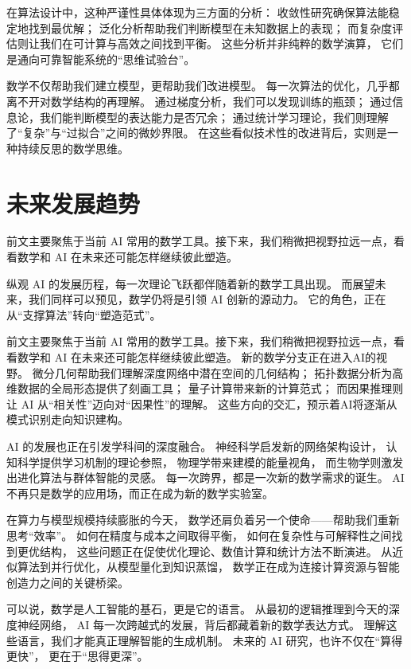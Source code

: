 在算法设计中，这种严谨性具体体现为三方面的分析：  
收敛性研究确保算法能稳定地找到最优解；  
泛化分析帮助我们判断模型在未知数据上的表现；  
而复杂度评估则让我们在可计算与高效之间找到平衡。  
这些分析并非纯粹的数学演算，  
它们是通向可靠智能系统的“思维试验台”。

数学不仅帮助我们建立模型，更帮助我们改进模型。  
每一次算法的优化，几乎都离不开对数学结构的再理解。  
通过梯度分析，我们可以发现训练的瓶颈；  
通过信息论，我们能判断模型的表达能力是否冗余；  
通过统计学习理论，我们则理解了“复杂”与“过拟合”之间的微妙界限。  
在这些看似技术性的改进背后，实则是一种持续反思的数学思维。

\section{未来发展趋势}
前文主要聚焦于当前 AI 常用的数学工具。接下来，我们稍微把视野拉远一点，看看数学和 AI 在未来还可能怎样继续彼此塑造。

纵观 AI 的发展历程，每一次理论飞跃都伴随着新的数学工具出现。  
而展望未来，我们同样可以预见，数学仍将是引领 AI 创新的源动力。  
它的角色，正在从“支撑算法”转向“塑造范式”。

前文主要聚焦于当前 AI 常用的数学工具。接下来，我们稍微把视野拉远一点，看看数学和 AI 在未来还可能怎样继续彼此塑造。
新的数学分支正在进入AI的视野。  
微分几何帮助我们理解深度网络中潜在空间的几何结构；  
拓扑数据分析为高维数据的全局形态提供了刻画工具；  
量子计算带来新的计算范式；  
而因果推理则让 AI 从“相关性”迈向对“因果性”的理解。  
这些方向的交汇，预示着AI将逐渐从模式识别走向知识建构。

AI 的发展也正在引发学科间的深度融合。  
神经科学启发新的网络架构设计，  
认知科学提供学习机制的理论参照，  
物理学带来建模的能量视角，  
而生物学则激发出进化算法与群体智能的灵感。  
每一次跨界，都是一次新的数学需求的诞生。  
AI 不再只是数学的应用场，而正在成为新的数学实验室。

在算力与模型规模持续膨胀的今天，  
数学还肩负着另一个使命——帮助我们重新思考“效率”。  
如何在精度与成本之间取得平衡，  
如何在复杂性与可解释性之间找到更优结构，  
这些问题正在促使优化理论、数值计算和统计方法不断演进。  
从近似算法到并行优化，从模型量化到知识蒸馏，  
数学正在成为连接计算资源与智能创造力之间的关键桥梁。

可以说，数学是人工智能的基石，更是它的语言。  
从最初的逻辑推理到今天的深度神经网络，  
AI 每一次跨越式的发展，背后都藏着新的数学表达方式。  
理解这些语言，我们才能真正理解智能的生成机制。  
未来的 AI 研究，也许不仅在“算得更快”，  
更在于“思得更深”。

